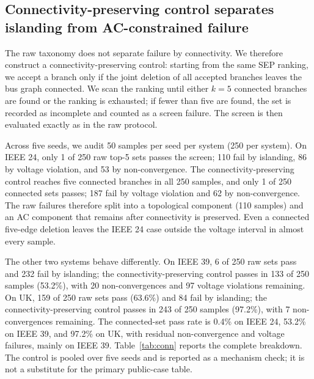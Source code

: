 \subsection{Connectivity-preserving control separates islanding from AC-constrained failure}\label{connectivity_control}

The raw taxonomy does not separate failure by connectivity. We therefore construct a connectivity-preserving control: starting from the same SEP ranking, we accept a branch only if the joint deletion of all accepted branches leaves the bus graph connected. We scan the ranking until either $k=5$ connected branches are found or the ranking is exhausted; if fewer than five are found, the set is recorded as incomplete and counted as a screen failure. The screen is then evaluated exactly as in the raw protocol. 

Across five seeds, we audit 50 samples per seed per system (250 per system). On IEEE 24, only 1 of 250 raw top-5 sets passes the screen; 110 fail by islanding, 86 by voltage violation, and 53 by non-convergence. The connectivity-preserving control reaches five connected branches in all 250 samples, and only 1 of 250 connected sets passes; 187 fail by voltage violation and 62 by non-convergence. The raw failures therefore split into a topological component (110 samples) and an AC component that remains after connectivity is preserved. Even a connected five-edge deletion leaves the IEEE 24 case outside the voltage interval in almost every sample.

The other two systems behave differently. On IEEE 39, 6 of 250 raw sets pass and 232 fail by islanding; the connectivity-preserving control passes in 133 of 250 samples (53.2\%), with 20 non-convergences and 97 voltage violations remaining. On UK, 159 of 250 raw sets pass (63.6\%) and 84 fail by islanding; the connectivity-preserving control passes in 243 of 250 samples (97.2\%), with 7 non-convergences remaining. The connected-set pass rate is 0.4\% on IEEE 24, 53.2\% on IEEE 39, and 97.2\% on UK, with residual non-convergence and voltage failures, mainly on IEEE 39. Table~\ref{tab:conn} reports the complete breakdown. The control is pooled over five seeds and is reported as a mechanism check; it is not a substitute for the primary public-case table.

